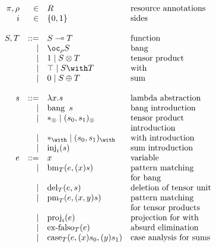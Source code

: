 \documentclass[sigplan,review]{acmart}\settopmatter{printfolios=true,printccs=false,printacmref=false}
\newcommand{\fun}[2]{#1 \multimap #2}
\newcommand{\lam}[2]{\lambda #1. #2}
\newcommand{\excl}[2]{\oc_{#1} #2}
\newcommand{\bang}[1]{\operatorname{bang}\ #1}
\newcommand{\bm}[3]{\operatorname{bm}_{#1}(#2, #3)}
\newcommand{\tensorOne}[0]{1}
\newcommand{\unit}[0]{{*}_\otimes}
\newcommand{\del}[3]{\operatorname{del}_{#1}(#2, #3)}
\newcommand{\tensor}[2]{#1 \otimes #2}
\newcommand{\ten}[2]{(#1, #2)_{\otimes}}
\newcommand{\prm}[3]{\operatorname{pm}_{#1}(#2, #3)}
\newcommand{\withTOne}[0]{\top}
\newcommand{\eat}[0]{{*}_{\with}}
\newcommand{\withT}[2]{#1 \with #2}
\newcommand{\wth}[2]{(#1, #2)_{\with}}
\newcommand{\proj}[2]{\operatorname{proj}_{#1}(#2)}
\newcommand{\sumTZero}[0]{0}
\newcommand{\exf}[2]{\operatorname{ex-falso}_{#1}(#2)}
\newcommand{\sumT}[2]{#1 \oplus #2}
\newcommand{\inj}[2]{\operatorname{inj}_{#1}(#2)}
\newcommand{\cse}[4]{\operatorname{case}_{#1}(#2, #3, #4)}
\newcommand{\bind}[2]{(#1)#2}
\begin{document}
\begin{displaymath}
  \begin{array}{rrll}
    \pi,\rho & \in & R & \textrm{resource annotations} \\
    i & \in & \{0,1\} & \textrm{sides} \\
    \\
    S,T &  ::= & \fun{S}{T}                    & \textrm{function} \\
        & \mid & \excl{\rho}{S}                & \textrm{bang} \\
        & \mid & \tensorOne \mid \tensor{S}{T} & \textrm{tensor product} \\
        & \mid & \withTOne \mid \withT{S}{T}   & \textrm{with} \\
        & \mid & \sumTZero \mid \sumT{S}{T}    & \textrm{sum} \\
    \\
    s &  ::= & \lam{x}{s} & \textrm{lambda abstraction} \\
      & \mid & \bang{s} & \textrm{bang introduction} \\
      & \mid & \unit \mid \ten{s_0}{s_1} & \textrm{tensor product} \\
      &      &                           & \textrm{introduction} \\
      & \mid & \eat \mid \wth{s_0}{s_1} & \textrm{with introduction} \\
      & \mid & \inj{i}{s} & \textrm{sum introduction} \\
    e &  ::= & x & \textrm{variable} \\
      & \mid & \bm{T}{e}{\bind{x}{s}}  & \textrm{pattern matching} \\
      &      &                         & \textrm{for bang} \\
      & \mid & \del{T}{e}{s} & \textrm{deletion of tensor unit} \\
      & \mid & \prm{T}{e}{\bind{x,y}{s}} & \textrm{pattern matching} \\
      &      &                           & \textrm{for tensor products} \\
      & \mid & \proj{i}{e} & \textrm{projection for with} \\
      & \mid & \exf{T}{e} & \textrm{absurd elimination} \\
      & \mid & \cse{T}{e}{\bind{x}{s_0}}{\bind{y}{s_1}}
                       & \textrm{case analysis for sums}
  \end{array}
\end{displaymath}
\end{document}
